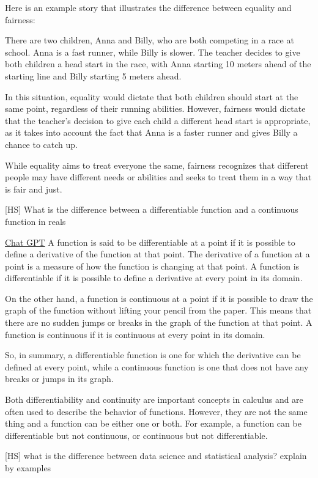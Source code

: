 \documentclass[
]{bxjsbook}
\theoremstyle{definition}
\theoremstyle{definition}
\theoremstyle{definition}
\theoremstyle{definition}
\theoremstyle{remark}
\begin{document}
Here is an example story that illustrates the difference between equality and fairness:

There are two children, Anna and Billy, who are both competing in a race at school. Anna is a fast runner, while Billy is slower. The teacher decides to give both children a head start in the race, with Anna starting 10 meters ahead of the starting line and Billy starting 5 meters ahead.

In this situation, equality would dictate that both children should start at the same point, regardless of their running abilities. However, fairness would dictate that the teacher's decision to give each child a different head start is appropriate, as it takes into account the fact that Anna is a faster runner and gives Billy a chance to catch up.

While equality aims to treat everyone the same, fairness recognizes that different people may have different needs or abilities and seeks to treat them in a way that is fair and just.

{[}HS{]} What is the difference between a differentiable function and a continuous function in reals

\protect\hyperlink{chatgpt}{Chat GPT} A function is said to be differentiable at a point if it is possible to define a derivative of the function at that point. The derivative of a function at a point is a measure of how the function is changing at that point. A function is differentiable if it is possible to define a derivative at every point in its domain.

On the other hand, a function is continuous at a point if it is possible to draw the graph of the function without lifting your pencil from the paper. This means that there are no sudden jumps or breaks in the graph of the function at that point. A function is continuous if it is continuous at every point in its domain.

So, in summary, a differentiable function is one for which the derivative can be defined at every point, while a continuous function is one that does not have any breaks or jumps in its graph.

Both differentiability and continuity are important concepts in calculus and are often used to describe the behavior of functions. However, they are not the same thing and a function can be either one or both. For example, a function can be differentiable but not continuous, or continuous but not differentiable.

{[}HS{]} what is the difference between data science and statistical analysis? explain by examples
\end{document}
